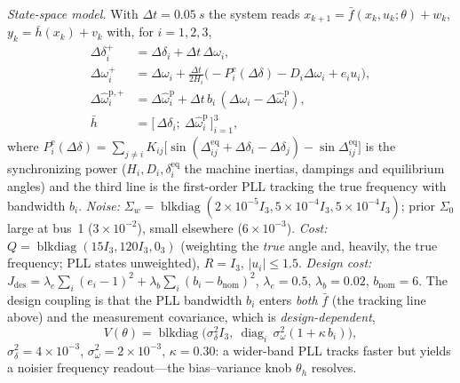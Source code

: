 \documentclass[twocolumn,amsthm]{autart}
\begin{document}
\emph{State-space model.} With $\Delta t=\SI{0.05}{s}$ the system reads
$x_{k+1}=\bar f(x_k,u_k;\theta)+w_k$, $y_k=\bar h(x_k)+v_k$ with, for $i=1,2,3$,
\begin{subequations}\label{eq:pll-model}
\begin{align}
\Delta\delta_i^{+} &= \Delta\delta_i + \Delta t\,\Delta\omega_i,\\
\Delta\omega_i^{+} &= \Delta\omega_i + \tfrac{\Delta t}{2H_i}
   \big(\!-P_i^{\mathrm e}(\Delta\delta) - D_i\Delta\omega_i + e_i u_i\big),\\
\Delta\hat\omega^{\mathrm p,+}_i &= \Delta\hat\omega^{\mathrm p}_i
   + \Delta t\,b_i\,(\Delta\omega_i - \Delta\hat\omega^{\mathrm p}_i),\\
\bar h &= \big[\,\Delta\delta_i;\ \Delta\hat\omega^{\mathrm p}_i\,\big]_{i=1}^{3},
\end{align}
\end{subequations}
where $P_i^{\mathrm e}(\Delta\delta)=\sum_{j\neq i}K_{ij}\big[\sin(\Delta^{\mathrm{eq}}_{ij}
+\Delta\delta_i-\Delta\delta_j)-\sin\Delta^{\mathrm{eq}}_{ij}\big]$ is the synchronizing
power ($H_i,D_i,\delta^{\mathrm{eq}}_i$ the machine inertias, dampings and
equilibrium angles) and the third line is the first-order PLL tracking the true
frequency with bandwidth $b_i$. \emph{Noise:} $\Sigma_w=\operatorname{blkdiag}
(2\!\times\!10^{-5}I_3,5\!\times\!10^{-4}I_3,5\!\times\!10^{-4}I_3)$; prior
$\Sigma_0$ large at bus~1 ($3\!\times\!10^{-2}$), small elsewhere
($6\!\times\!10^{-3}$). \emph{Cost:} $Q=\operatorname{blkdiag}(15I_3,120I_3,0_3)$
(weighting the \emph{true} angle and, heavily, the true frequency; PLL states
unweighted), $R=I_3$, $|u_i|\le1.5$. \emph{Design cost:}
$J_{\mathrm{des}}=\lambda_e\sum_i(e_i-1)^2+\lambda_b\sum_i(b_i-b_{\mathrm{nom}})^2$,
$\lambda_e=0.5$, $\lambda_b=0.02$, $b_{\mathrm{nom}}=6$. The design coupling is
that the PLL bandwidth $b_i$ enters \emph{both} $\bar f$ (the tracking line above)
and the measurement covariance, which is \emph{design-dependent},
\begin{equation}\label{eq:pll-V}
V(\theta)=\operatorname{blkdiag}\!\big(\sigma_\delta^2 I_3,\
\operatorname{diag}_i\,\sigma_\omega^2(1+\kappa\,b_i)\big),
\end{equation}
$\sigma_\delta^2=4\!\times\!10^{-3}$, $\sigma_\omega^2=2\!\times\!10^{-3}$,
$\kappa=0.30$: a wider-band PLL tracks faster but yields a noisier frequency
readout---the bias--variance knob $\theta_h$ resolves.
\end{document}
